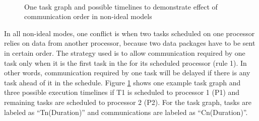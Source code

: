 \documentclass[msc,deptreport, cs]{infthesis}
\begin{document}
\begin{figure}[!htb]
  \centering
  \vspace{1em}
  \hspace{3em}
   \hspace{4em}
   \\
   \hspace{1em}
  \caption{One task graph and possible timelines to demonstrate effect of communication order in non-ideal models}
  \label{fig:conflict1}
\end{figure}

In all non-ideal modes, one conflict is when two tasks scheduled on one processor relies on data from another processor, because two data packages have to be sent in certain order. The strategy used is to allow communication required by one task only when it is the first task in the for its scheduled processor (rule 1). In other words, communication required by one task will be delayed if there is any task ahead of it in the schedule. Figure \ref{fig:conflict1} shows one example task graph and three possible execution timelines if T1 is scheduled to processor 1 (P1) and remaining tasks are scheduled to processor 2 (P2). For the task graph, tasks are labeled as ``Tn(Duration)'' and communications are labeled as ``Cn(Duration)''.
\end{document}
